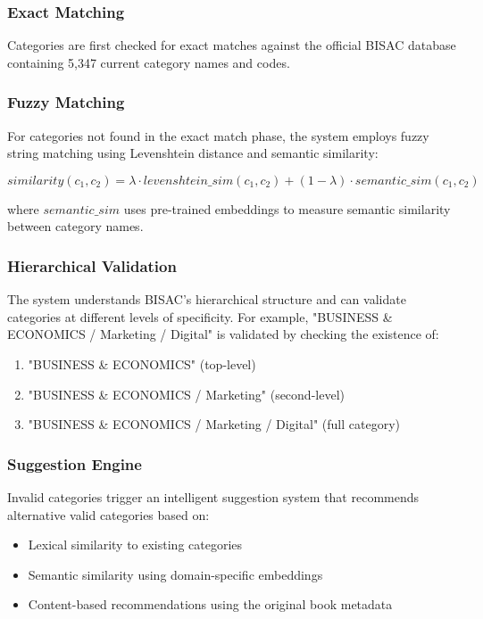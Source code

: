 \documentclass{article}
\begin{document}
\subsubsection{Exact Matching}
Categories are first checked for exact matches against the official BISAC database containing 5,347 current category names and codes.

\subsubsection{Fuzzy Matching}
For categories not found in the exact match phase, the system employs fuzzy string matching using Levenshtein distance and semantic similarity:

\begin{equation}
similarity(c_1, c_2) = \lambda \cdot levenshtein\_sim(c_1, c_2) + (1-\lambda) \cdot semantic\_sim(c_1, c_2)
\end{equation}

where $semantic\_sim$ uses pre-trained embeddings to measure semantic similarity between category names.

\subsubsection{Hierarchical Validation}
The system understands BISAC's hierarchical structure and can validate categories at different levels of specificity. For example, "BUSINESS \& ECONOMICS / Marketing / Digital" is validated by checking the existence of:
\begin{enumerate}
\item "BUSINESS \& ECONOMICS" (top-level)
\item "BUSINESS \& ECONOMICS / Marketing" (second-level)
\item "BUSINESS \& ECONOMICS / Marketing / Digital" (full category)
\end{enumerate}

\subsubsection{Suggestion Engine}
Invalid categories trigger an intelligent suggestion system that recommends alternative valid categories based on:
\begin{itemize}
\item Lexical similarity to existing categories
\item Semantic similarity using domain-specific embeddings
\item Content-based recommendations using the original book metadata
\end{itemize}
\end{document}
